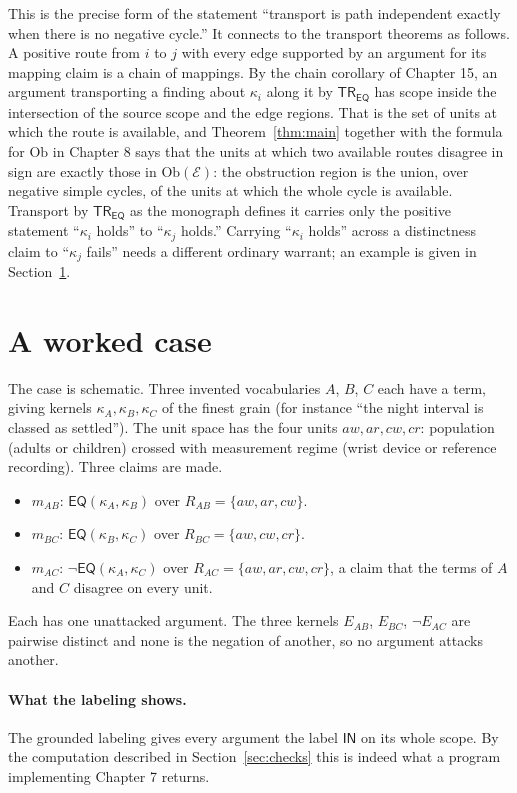 \documentclass[11pt]{article}
\theoremstyle{plain}
\theoremstyle{definition}
\theoremstyle{remark}
\newcommand{\Ob}{\mathrm{Ob}}
\newcommand{\IN}{\textsf{IN}}
\newcommand{\EQ}{\mathsf{EQ}}
\newcommand{\TR}{\mathsf{TR}}
\newcommand{\nk}[1]{\neg#1}
\begin{document}
This is the precise form of the statement ``transport is path independent exactly when there is no negative cycle.'' It connects to the transport theorems as follows. A positive route from $i$ to $j$ with every edge supported by an argument for its mapping claim is a chain of mappings. By the chain corollary of Chapter 15, an argument transporting a finding about $\kappa_i$ along it by $\TR_{\EQ}$ has scope inside the intersection of the source scope and the edge regions. That is the set of units at which the route is available, and Theorem~\ref{thm:main} together with the formula for $\Ob$ in Chapter 8 says that the units at which two available routes disagree in sign are exactly those in $\Ob(\mathcal E)$: the obstruction region is the union, over negative simple cycles, of the units at which the whole cycle is available. Transport by $\TR_{\EQ}$ as the monograph defines it carries only the positive statement ``$\kappa_i$ holds'' to ``$\kappa_j$ holds.'' Carrying ``$\kappa_i$ holds'' across a distinctness claim to ``$\kappa_j$ fails'' needs a different ordinary warrant; an example is given in Section~\ref{sec:example}.

\section{A worked case}\label{sec:example}

The case is schematic. Three invented vocabularies $A$, $B$, $C$ each have a term, giving kernels $\kappa_A,\kappa_B,\kappa_C$ of the finest grain (for instance ``the night interval is classed as settled''). The unit space has the four units $aw,ar,cw,cr$: population (adults or children) crossed with measurement regime (wrist device or reference recording). Three claims are made.
\begin{itemize}[nosep]
\item $m_{AB}$: $\EQ(\kappa_A,\kappa_B)$ over $R_{AB}=\{aw,ar,cw\}$.
\item $m_{BC}$: $\EQ(\kappa_B,\kappa_C)$ over $R_{BC}=\{aw,cw,cr\}$.
\item $m_{AC}$: $\nk{\EQ(\kappa_A,\kappa_C)}$ over $R_{AC}=\{aw,ar,cw,cr\}$, a claim that the terms of $A$ and $C$ disagree on every unit.
\end{itemize}
Each has one unattacked argument. The three kernels $E_{AB}$, $E_{BC}$, $\nk{E_{AC}}$ are pairwise distinct and none is the negation of another, so no argument attacks another.

\paragraph{What the labeling shows.} The grounded labeling gives every argument the label $\IN$ on its whole scope. By the computation described in Section~\ref{sec:checks} this is indeed what a program implementing Chapter 7 returns.
\end{document}
